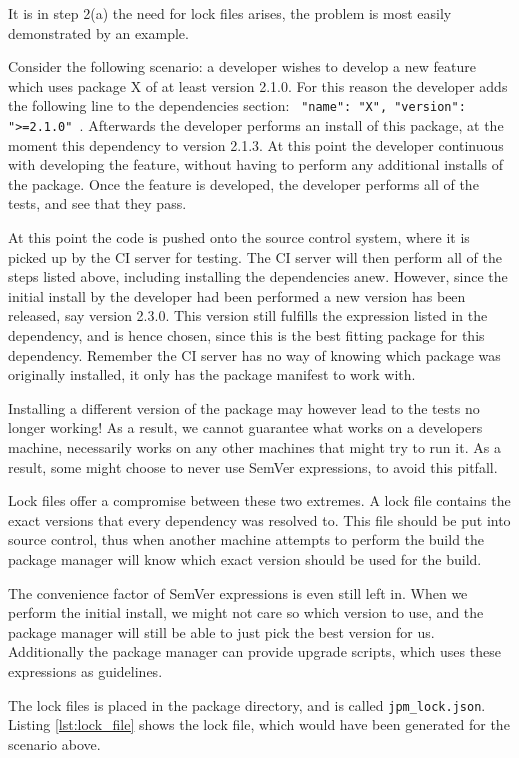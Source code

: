 It is in step 2(a) the need for lock files arises, the problem is most easily
demonstrated by an example.

Consider the following scenario: a developer wishes to develop a new feature
which uses package X of at least version 2.1.0. For this reason the developer
adds the following line to the dependencies section: \texttt{{
"name": "X", "version": ">=2.1.0" }}. Afterwards the developer performs an
install of this package, at the moment this dependency to version 2.1.3. At
this point the developer continuous with developing the feature, without
having to perform any additional installs of the package. Once the feature
is developed, the developer performs all of the tests, and see that they
pass.

At this point the code is pushed onto the source control system, where it is
picked up by the CI server for testing. The CI server will then perform all of
the steps listed above, including installing the dependencies anew. However,
since the initial install by the developer had been performed a new version
has been released, say version 2.3.0. This version still fulfills the
expression listed in the dependency, and is hence chosen, since this is the
best fitting package for this dependency. Remember the CI server has no way
of knowing which package was originally installed, it only has the package
manifest to work with.

Installing a different version of the package may however lead to the tests no
longer working! As a result, we cannot guarantee what works on a developers
machine, necessarily works on any other machines that might try to run it.
As a result, some might choose to never use SemVer expressions, to avoid this
pitfall.

Lock files offer a compromise between these two extremes. A lock file contains
the exact versions that every dependency was resolved to. This file should be
put into source control, thus when another machine attempts to perform the
build the package manager will know which exact version should be used for the
build.

The convenience factor of SemVer expressions is even still left in. When we
perform the initial install, we might not care so which version to use, and the
package manager will still be able to just pick the best version for us.
Additionally the package manager can provide upgrade scripts, which uses these
expressions as guidelines.

The lock files is placed in the package directory, and is called
\verb!jpm_lock.json!. Listing \ref{lst:lock_file} shows the lock file, which
would have been generated for the scenario above.

